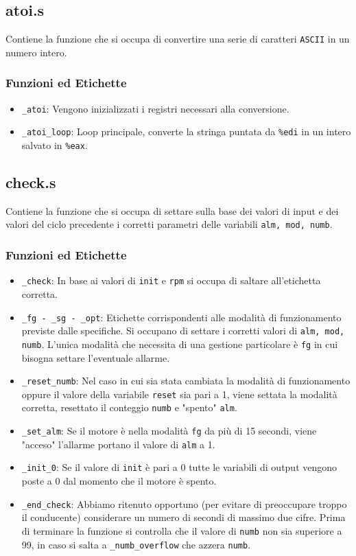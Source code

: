 \documentclass[a4paper,11pt]{article}
\begin{document}
	\subsection{atoi.s}
	Contiene la funzione che si occupa di convertire una serie di caratteri \texttt{ASCII} in un numero intero. 
	\subsubsection{Funzioni ed Etichette}
	\begin{itemize}
		\item \texttt{\_atoi}: Vengono inizializzati i registri necessari alla conversione.
		\item \texttt{\_atoi\_loop}: Loop principale, converte la stringa puntata da \texttt{\%edi} in un intero salvato in \texttt{\%eax}. 
	\end{itemize}
	
	\subsection{check.s}
	Contiene la funzione che si occupa di settare sulla base dei valori di input e dei valori del ciclo precedente i corretti parametri delle variabili \texttt{alm, mod, numb}. 
	\subsubsection{Funzioni ed Etichette}
	\begin{itemize}
		\item \texttt{\_check}: In base ai valori di \texttt{init} e \texttt{rpm} si occupa di saltare all'etichetta corretta. 
		\item \texttt{\_fg - \_sg - \_opt}: Etichette corrispondenti alle modalità di funzionamento previste dalle specifiche. Si occupano di settare i corretti valori di \texttt{alm, mod, numb}. L'unica modalità che necessita di una gestione particolare è \texttt{fg} in cui bisogna settare l'eventuale allarme. 
		\item \texttt{\_reset\_numb}: Nel caso in cui sia stata cambiata la modalità di funzionamento oppure il valore della variabile \texttt{reset} sia pari a 1, viene settata la modalità corretta, resettato il conteggio \texttt{numb} e "spento" \texttt{alm}.
		\item \texttt{\_set\_alm}: Se il motore è nella modalità \texttt{fg} da più di 15 secondi, viene "acceso" l'allarme portano il valore di \texttt{alm} a 1.
		\item \texttt{\_init\_0}: Se il valore di \texttt{init} è pari a 0 tutte le variabili di output vengono poste a 0 dal momento che il motore è spento. 
		\item \texttt{\_end\_check}: Abbiamo ritenuto opportuno (per evitare di preoccupare troppo il conducente) considerare un numero di secondi di massimo due cifre. Prima di terminare la funzione si controlla che il valore di \texttt{numb} non sia superiore a 99, in caso si salta a \texttt{\_numb\_overflow} che azzera \texttt{numb}.
	\end{itemize}
	
\end{document}
